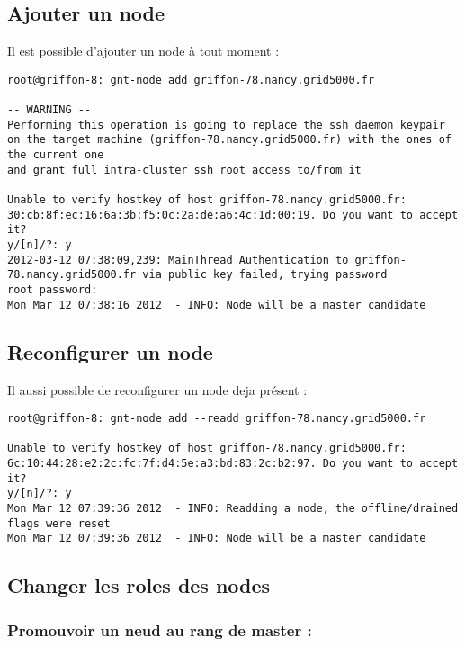 \subsection {Ajouter un node}
Il est possible d'ajouter un node à tout moment :
\begin{lstlisting}
root@griffon-8: gnt-node add griffon-78.nancy.grid5000.fr

-- WARNING -- 
Performing this operation is going to replace the ssh daemon keypair
on the target machine (griffon-78.nancy.grid5000.fr) with the ones of the current one
and grant full intra-cluster ssh root access to/from it

Unable to verify hostkey of host griffon-78.nancy.grid5000.fr:
30:cb:8f:ec:16:6a:3b:f5:0c:2a:de:a6:4c:1d:00:19. Do you want to accept
it?
y/[n]/?: y
2012-03-12 07:38:09,239: MainThread Authentication to griffon-78.nancy.grid5000.fr via public key failed, trying password
root password:
Mon Mar 12 07:38:16 2012  - INFO: Node will be a master candidate
\end{lstlisting}
\subsection{Reconfigurer un node}
Il aussi possible de reconfigurer un node deja présent :
\begin{lstlisting}
root@griffon-8: gnt-node add --readd griffon-78.nancy.grid5000.fr

Unable to verify hostkey of host griffon-78.nancy.grid5000.fr:
6c:10:44:28:e2:2c:fc:7f:d4:5e:a3:bd:83:2c:b2:97. Do you want to accept
it?
y/[n]/?: y
Mon Mar 12 07:39:36 2012  - INFO: Readding a node, the offline/drained flags were reset
Mon Mar 12 07:39:36 2012  - INFO: Node will be a master candidate
\end{lstlisting}
\subsection {Changer les roles des nodes}

\subsubsection {Promouvoir un neud au rang de master :}

